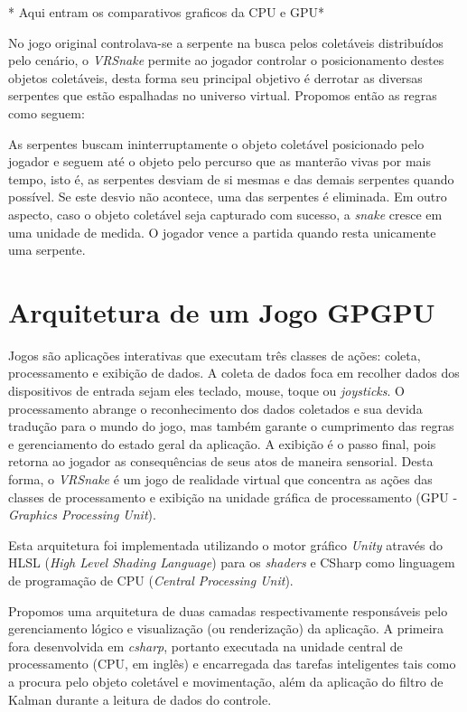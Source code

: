 \documentclass[conference]{IEEEtran}
\begin{document}
* Aqui entram os comparativos graficos da CPU e GPU*

No jogo original controlava-se a serpente na busca pelos coletáveis distribuídos pelo cenário, o \textit{VRSnake} permite ao jogador controlar o posicionamento destes objetos coletáveis, desta forma seu principal objetivo é derrotar as diversas serpentes que estão espalhadas no universo virtual. Propomos então as regras como seguem:

As serpentes buscam ininterruptamente o objeto coletável posicionado pelo jogador e seguem até o objeto pelo percurso que as manterão vivas por mais tempo, isto é, as serpentes desviam de si mesmas e das demais serpentes quando possível. Se este desvio não acontece, uma das serpentes é eliminada. Em outro aspecto, caso o objeto coletável seja capturado com sucesso, a \textit{snake} cresce em uma unidade de medida. O jogador vence a partida quando resta unicamente uma serpente.

\section{Arquitetura de um Jogo GPGPU}
Jogos são aplicações interativas que executam três classes de ações: coleta, processamento e exibição de dados. %
A coleta de dados foca em recolher dados dos dispositivos de entrada sejam eles teclado, mouse, toque ou \textit{joysticks}. O processamento abrange o reconhecimento dos dados coletados e sua devida tradução para o mundo do jogo, mas também garante o cumprimento das regras e gerenciamento do estado geral da aplicação. A exibição é o passo final, pois retorna ao jogador as consequências de seus atos de maneira sensorial. Desta forma, o \textit{VRSnake} é um jogo de realidade virtual que concentra as ações das classes de processamento e exibição na unidade gráfica de processamento (GPU - \textit{Graphics Processing Unit}). 

Esta arquitetura foi implementada utilizando o motor gráfico \textit{Unity} através do HLSL (\textit{High Level Shading Language}) para os \textit{shaders} e CSharp como linguagem de programação de CPU (\textit{Central Processing Unit}).



Propomos uma arquitetura de duas camadas respectivamente responsáveis pelo gerenciamento lógico e visualização (ou renderização) da aplicação. A primeira fora desenvolvida em \textit{csharp}, portanto executada na unidade central de processamento (CPU, em inglês) e encarregada das tarefas inteligentes tais como a procura pelo objeto coletável e movimentação, além da aplicação do filtro de Kalman durante a leitura de dados do controle.
\end{document}
